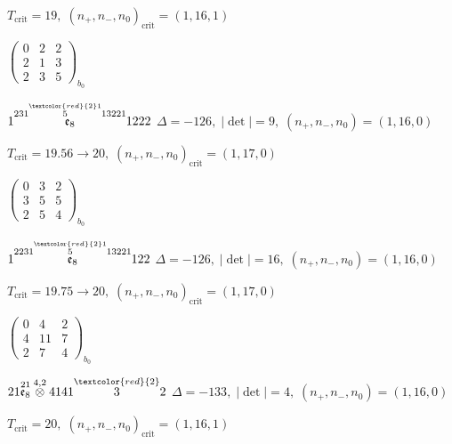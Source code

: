 \documentclass[10pt]{article}
\begin{document}
\hspace{1em}$T_{\text{crit}}=19,\; (n_+,n_-,n_0)_{\text{crit}}=(1,16,1)$

\hspace{2em}$\left(\begin{smallmatrix}0 & 2 & 2 \\ 2 & 1 & 3 \\ 2 & 3 & 5\end{smallmatrix}\right)_{\!b_0}$

\smallskip

$1\overset{231\overset{\textcolor{red}{2}1}{5}13221}{\mathfrak{e}_8}1222$ \quad $\Delta=-126,\; |\det|=9,\; (n_+,n_-,n_0)=(1,16,0)$

\hspace{1em}$T_{\text{crit}}=19.56 \to 20,\; (n_+,n_-,n_0)_{\text{crit}}=(1,17,0)$

\hspace{2em}$\left(\begin{smallmatrix}0 & 3 & 2 \\ 3 & 5 & 5 \\ 2 & 5 & 4\end{smallmatrix}\right)_{\!b_0}$

\smallskip

$1\overset{2231\overset{\textcolor{red}{2}1}{5}13221}{\mathfrak{e}_8}122$ \quad $\Delta=-126,\; |\det|=16,\; (n_+,n_-,n_0)=(1,16,0)$

\hspace{1em}$T_{\text{crit}}=19.75 \to 20,\; (n_+,n_-,n_0)_{\text{crit}}=(1,17,0)$

\hspace{2em}$\left(\begin{smallmatrix}0 & 4 & 2 \\ 4 & 11 & 7 \\ 2 & 7 & 4\end{smallmatrix}\right)_{\!b_0}$

\smallskip

$21\overset{21}{\mathfrak{e}_8}\overset{4,2}{\otimes}4141\overset{\textcolor{red}{2}}{3}2$ \quad $\Delta=-133,\; |\det|=4,\; (n_+,n_-,n_0)=(1,16,0)$

\hspace{1em}$T_{\text{crit}}=20,\; (n_+,n_-,n_0)_{\text{crit}}=(1,16,1)$
\end{document}
